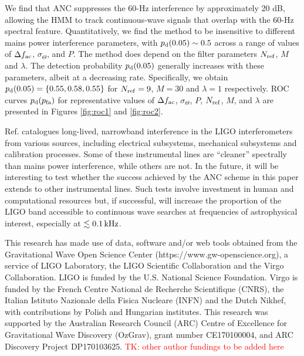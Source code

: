 \documentclass[pra,superscriptaddress,reprint,amsmath,amssymb,nofootinbib]{revtex4-2}
\begin{document}
We find that ANC suppresses the 60-Hz interference by approximately 20 dB, allowing the HMM to track continuous-wave signals that overlap with the 60-Hz spectral feature. Quantitatively, we find the method to be insensitive to different mains power interference parameters, with $p_{\rm d}(0.05) \sim 0.5$ across a range of values of $\Delta f_{\rm ac}$, $\sigma_\Theta$, and $P$. The method does depend on the filter parameters $N_{\rm ref}$, $M$ and $\lambda$. The detection probability $p_{\rm d}(0.05)$ generally increases with these parameters, albeit at a decreasing rate. Specifically, we obtain $p_{\rm d}(0.05) = \{0.55, 0.58,0.55\}$ for $N_{\rm ref} = 9$, $M=30$ and $\lambda=1$ respectively. ROC curves $p_{\rm d}(p_{\rm fa})$ for representative values of $\Delta f_{\rm ac}$, $\sigma_\Theta$, $P$, $N_{\rm ref}$, $M$, and $\lambda$ are presented in Figures \ref{fig:roc1} and \ref{fig:roc2}. \newline 

Ref. \cite{CovasEtAl:2018} catalogues long-lived, narrowband interference in the LIGO interferometers from various sources, including electrical subsystems, mechanical subsystems and calibration processes. Some of these instrumental lines are ``cleaner'' spectrally than mains power interference, while others are not. In the future, it will be interesting to test whether the success achieved by the ANC scheme in this paper extends to other instrumental lines. Such tests involve investment in human and computational resources but, if successful, will increase the proportion of the LIGO band accessible to continuous wave searches at frequencies of astrophysical interest, especially at $\lesssim 0.1 \, {\rm kHz}$.



%




\begin{acknowledgements}
This research has made use of data, software and/or web tools obtained from the Gravitational Wave Open Science Center (https://www.gw-openscience.org), a service of LIGO Laboratory, the LIGO Scientific Collaboration and the Virgo Collaboration. LIGO is funded by the U.S. National Science Foundation. Virgo is funded by the French Centre National de Recherche Scientifique (CNRS), the Italian Istituto Nazionale della Fisica Nucleare (INFN) and the Dutch Nikhef, with contributions by Polish and Hungarian institutes. This research was supported by
the Australian Research Council (ARC) Centre of Excellence for Gravitational Wave Discovery (OzGrav), grant number CE170100004, and ARC Discovery Project DP170103625. \textcolor{red}{TK: other author fundings to be added here}
\end{acknowledgements}
\end{document}
